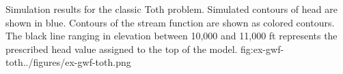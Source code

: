 \begin{StandardFigure}{
                                     Simulation results for the classic Toth problem.
                                     Simulated contours of head are shown in blue.
                                     Contours of the stream function are shown as colored contours.
                                     The black line ranging in elevation between 10,000 and 11,000 ft 
                                     represents the prescribed head value assigned to the top of the model.
                                     }{fig:ex-gwf-toth}{../figures/ex-gwf-toth.png}
\end{StandardFigure}                                 


